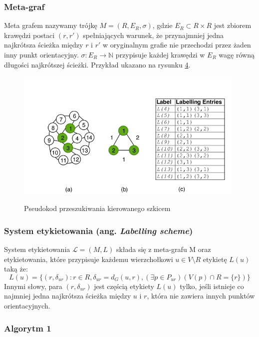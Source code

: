 \documentclass{article}
\theoremstyle{definition}
\begin{document}
        \subsubsection*{Meta-graf}
            Meta grafem nazywamy trójkę $M = (R, E_R, \sigma)$, gdzie $E_R \subset R \times R$ jest zbiorem krawędzi postaci $(r, r')$ spełniających warunek, że przynajmniej jedna najkrótsza ścieżka między $r$ i $r'$ w oryginalnym grafie nie przechodzi przez żaden inny punkt orientacyjny. $\sigma: E_R \rightarrow \mathbb{N}$ przypisuje każdej krawędzi w $E_R$ wagę równą długości najkrótszej ścieżki. Przykład ukazano na rysunku \hyperref[fig:meta]{4}.

            \begin{figure}[!tbh]
                \includegraphics[width=11cm]{img/meta-graph.png}
                \centering
                \label{fig:meta}
                \caption{Pseudokod przeszukiwania kierowanego szkicem}
            \end{figure}

        \subsubsection*{System etykietowania (ang. \textit{Labelling scheme})}
            System etykietowania $\mathcal{L} = (M,L)$ składa się z meta-grafu M oraz etykietowania, które przypisuje każdemu wierzchołkowi $u \in V \setminus R$ etykietę $L(u)$ taką że:
            \[ 
                L(u) = \{(r, \delta_{ur}) : r \in R, \delta_{ur} = d_G(u,r), (\exists p \in P_{ur})(V(p) \cap R = \{r\}) \}
            \]
            Innymi słowy, para $(r, \delta_{ur})$ jest częścią etykiety $L(u)$ tylko, jeśli istnieje co najmniej jedna najkrótsza ścieżka między $u$ i $r$, która nie zawiera innych punktów orientacyjnych. 

        \subsubsection*{Algorytm 1} 
\end{document}
